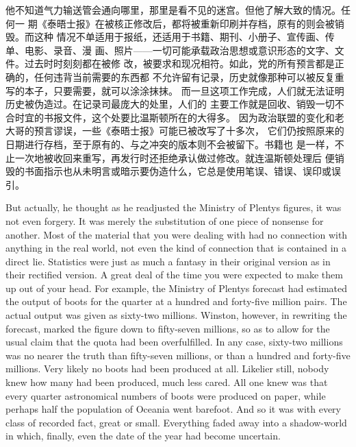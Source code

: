 \begin{paracol}{2}
\switchcolumn

他不知道气力输送管会通向哪里，那里是看不见的迷宫。但他了解大致的情况。任何一
期《泰晤士报》在被核正修改后，都将被重新印刷并存档，原有的则会被销毁。而这种
情况不单适用于报纸，还适用于书籍、期刊、小册子、宣传画、传单、电影、录音、漫
画、照片——一切可能承载政治思想或意识形态的文字、文件。过去时时刻刻都在被修
改，被要求和现况相符。如此，党的所有预言都是正确的，任何违背当前需要的东西都
不允许留有记录，历史就像那种可以被反复重写的本子，只要需要，就可以涂涂抹抹。
而一旦这项工作完成，人们就无法证明历史被伪造过。在记录司最庞大的处里，人们的
主要工作就是回收、销毁一切不合时宜的书报文件，这个处要比温斯顿所在的大得多。
因为政治联盟的变化和老大哥的预言谬误，一些《泰晤士报》可能已被改写了十多次，
它们仍按照原来的日期进行存档，至于原有的、与之冲突的版本则不会被留下。书籍也
是一样，不止一次地被收回来重写，再发行时还拒绝承认做过修改。就连温斯顿处理后
便销毁的书面指示也从未明言或暗示要伪造什么，它总是使用笔误、错误、误印或误
引。

\switchcolumn*

But actually, he thought as he readjusted the Ministry of
Plenty\textquotesingle s figures, it was not even forgery. It was merely
the substitution of one piece of nonsense for another. Most of the
material that you were dealing with had no connection with anything in
the real world, not even the kind of connection that is contained in a
direct lie. Statistics were just as much a fantasy in their original
version as in their rectified version. A great deal of the time you were
expected to make them up out of your head. For example, the Ministry of
Plenty\textquotesingle s forecast had estimated the output of boots for
the quarter at a hundred and forty-five million pairs. The actual output
was given as sixty-two millions. Winston, however, in rewriting the
forecast, marked the figure down to fifty-seven millions, so as to allow
for the usual claim that the quota had been overfulfilled. In any case,
sixty-two millions was no nearer the truth than fifty-seven millions, or
than a hundred and forty-five millions. Very likely no boots had been
produced at all. Likelier still, nobody knew how many had been produced,
much less cared. All one knew was that every quarter astronomical
numbers of boots were produced on paper, while perhaps half the
population of Oceania went barefoot. And so it was with every class of
recorded fact, great or small. Everything faded away into a shadow-world
in which, finally, even the date of the year had become uncertain.

\switchcolumn


\end{paracol}
